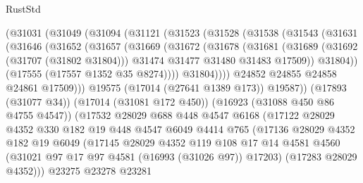 \begin{lexlean}{RustStd}
\begin{coremodule}
{\begin{coremodule}
{{{{{{{{{{{{{{{{{{{{{{{{{{{{{{{{{{{{{{{{{{{{{{{{{{{{{{{            (@31031
              (@31049
                (@31094
                  (@31121
                    (@31523
                      (@31528
                        (@31538
                          (@31543
                            (@31631
                              (@31646
                                (@31652
                                  (@31657
                                    (@31669
                                      (@31672
                                        (@31678
                                          (@31681
                                            (@31689
                                              (@31692 (@31707 (@31802 @31804)))
                                              @31474
                                              @31477
                                              @31480
                                              @31483
                                              @17509))
                                          @31804))
                                      (@17555 (@17557 @1352 @35 @8274))))
                                  @31804))))
                          @24852
                          @24855
                          @24858
                          @24861
                          @17509)))
                    @19575
                    (@17014 (@27641 @1389 @173))
                    @19587))
                (@17893 (@31077 @34))
                (@17014 (@31081 @172 @450))
                (@16923 (@31088 @450 @86 @4755 @4547))
                (@17532
                  @28029
                  @688
                  @448
                  @4547
                  @6168
                  (@17122
                    @28029
                    @4352
                    @330
                    @182
                    @19
                    @448
                    @4547
                    @6049
                    @4414
                    @765
                    (@17136
                      @28029
                      @4352
                      @182
                      @19
                      @6049
                      (@17145
                        @28029
                        @4352
                        @119
                        @108
                        @17
                        @14
                        @4581
                        @4560
                        (@31021 @97 @17 @97 @4581 (@16993 (@31026 @97)) @17203)
                        (@17283 @28029 @4352)))
                    @23275
                    @23278
                    @23281
}}}}}}}}}}}}}}}}}}}}}}}}}}}}}}}}}}}}}}}}}}}}}}}}}}}}}}}
\end{coremodule}}
\end{coremodule}
\end{lexlean}
